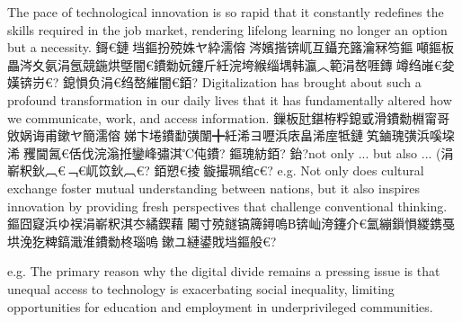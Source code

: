 ﻿\documentclass[lang=cn,11pt]{elegantbook}
\begin{document}
The pace of technological innovation is so rapid that it constantly redefines the skills required in the job market, rendering lifelong learning no longer an option but a necessity.
鎶€鏈垱鏂扮殑姝ヤ紣濡傛涔嬪揩锛屼互鑷充簬瀹冧笉鏂噸鏂板畾涔夊氨涓氬競鍦烘墍闇€鐨勬妧鑳斤紝浣垮緱缁堣韩瀛︿範涓嶅啀鏄竴绉嶉€夋嫨锛岃€?
鎴愪负涓€绉嶅繀闇€銆?
Digitalization has brought about such a profound transformation in our daily lives that it has fundamentally
altered how we communicate, work, and access information.
鏁板瓧鍖栫粰鎴戜滑鐨勬棩甯哥敓娲诲甫鏉ヤ簡濡傛娣卞埢鐨勫彉闈╋紝浠ヨ嚦浜庡畠浠庢牴鏈笂鏀瑰彉浜嗘垜浠矡閫氥€佸伐浣滃拰鑾峰彇淇℃伅鐨?
鏂瑰紡銆?
鈶?not only ... but also ... (涓嶄粎鈥︹€﹁€屼笖鈥︹€? 銆愬€掕鏇撮珮绾с€?
e.g. Not only does cultural exchange foster mutual understanding between nations, but it also inspires innovation by
providing fresh perspectives that challenge conventional thinking.
鏂囧寲浜ゆ祦涓嶄粎淇冭繘鍥藉闂寸殑鐩镐簰鐞嗚В锛屾洿鑳介€氳繃鎻愪緵鎸戞垬浼犵粺鎬濈淮鐨勬柊瑙嗚鏉ユ縺鍙戝垱鏂般€?



e.g. The primary reason why the digital divide remains a pressing issue is that unequal access to technology is
exacerbating social inequality, limiting opportunities for education and employment in underprivileged communities.
\end{document}
